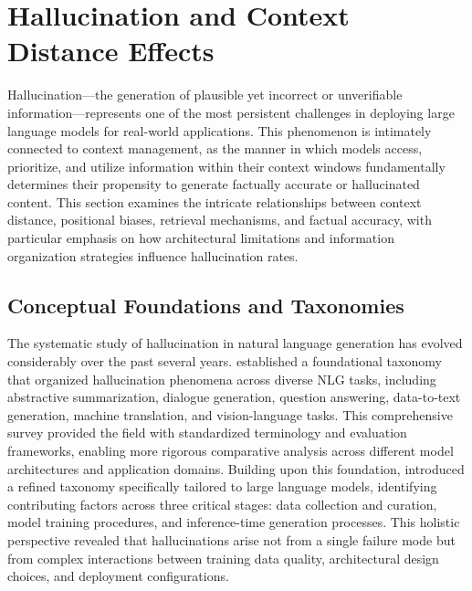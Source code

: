 \section{Hallucination and Context Distance Effects}
\label{sec:hallucination}

Hallucination---the generation of plausible yet incorrect or unverifiable information---represents one of the most persistent challenges in deploying large language models for real-world applications. This phenomenon is intimately connected to context management, as the manner in which models access, prioritize, and utilize information within their context windows fundamentally determines their propensity to generate factually accurate or hallucinated content. This section examines the intricate relationships between context distance, positional biases, retrieval mechanisms, and factual accuracy, with particular emphasis on how architectural limitations and information organization strategies influence hallucination rates.

\subsection{Conceptual Foundations and Taxonomies}

The systematic study of hallucination in natural language generation has evolved considerably over the past several years. \citet{ji2023survey} established a foundational taxonomy that organized hallucination phenomena across diverse NLG tasks, including abstractive summarization, dialogue generation, question answering, data-to-text generation, machine translation, and vision-language tasks. This comprehensive survey provided the field with standardized terminology and evaluation frameworks, enabling more rigorous comparative analysis across different model architectures and application domains. Building upon this foundation, \citet{huang2023survey} introduced a refined taxonomy specifically tailored to large language models, identifying contributing factors across three critical stages: data collection and curation, model training procedures, and inference-time generation processes. This holistic perspective revealed that hallucinations arise not from a single failure mode but from complex interactions between training data quality, architectural design choices, and deployment configurations.

